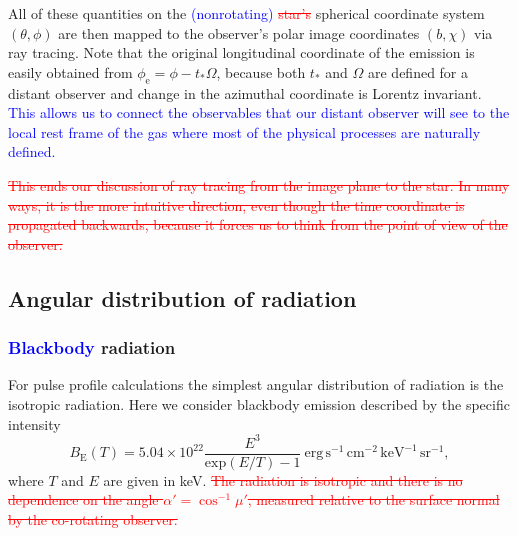\documentclass{aa}
\newcommand{\refe}[1]{\textcolor{blue}{{#1}}}
\newcommand{\refedel}[1]{\textcolor{red}{\sout{#1}}}
\begin{document}
All of these quantities on the \refe{(nonrotating)} \refedel{star's} spherical coordinate system $(\theta, \phi)$ are then mapped to the observer's polar image coordinates $(b, \chi)$ via ray tracing.
Note that the original longitudinal coordinate of the emission is easily obtained from $\phi_{\mathrm{e}} = \phi - t_* \Omega$, because both $t_*$ and $\Omega$ are defined for a distant observer and change in the azimuthal coordinate is Lorentz invariant.
\refe{This allows us to connect the observables that our distant observer will see to the local rest frame of the gas where most of the physical processes are naturally defined.}

\refedel{
This ends our discussion of ray tracing from the image plane to the star.
In many ways, it is the more intuitive direction, even though the time coordinate is propagated backwards, because it forces us to think from the point of view of the observer.
}



\subsection{Angular distribution of radiation}\label{sect:angular_distr}
\subsubsection{\refe{Blackbody} radiation}

For pulse profile calculations the simplest angular distribution of radiation is the isotropic radiation.
Here we consider blackbody emission described by the specific intensity
\begin{equation}
  B_{\mathrm{E}}(T) = 5.04 \times 10^{22} \frac{E^3}{\mathrm{exp}(E/T) -1}~\mathrm{erg}\,\mathrm{s}^{-1}\,\mathrm{cm}^{-2}\,\mathrm{keV}^{-1}\,\mathrm{sr}^{-1},
\end{equation}
where $T$ and $E$ are given in keV.
\refedel{The radiation is isotropic and there is no dependence on the angle $\alpha'=\cos^{-1}\mu'$, measured relative to the surface normal by the co-rotating observer.}
\end{document}
